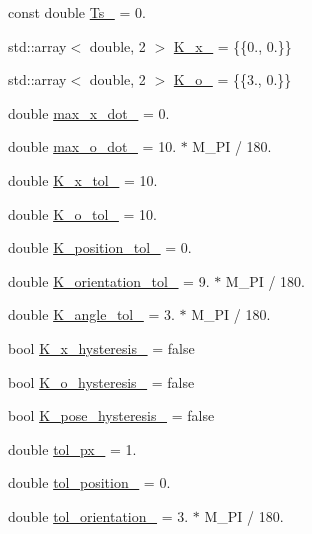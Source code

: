 \begin{DoxyCompactItemize}
const double \hyperlink{classVisualServoingServer_a48bcc91d15c80f7b3b248fa205e8e3de}{Ts\+\_\+} = 0.
\item 
std\+::array$<$ double, 2 $>$ \hyperlink{classVisualServoingServer_a6153b1e315817cf41cb36b7deca83be7}{K\+\_\+x\+\_\+} = \{\{0., 0.\}\}
\item 
std\+::array$<$ double, 2 $>$ \hyperlink{classVisualServoingServer_a5a7eaa18a77566e129a325e556691e24}{K\+\_\+o\+\_\+} = \{\{3., 0.\}\}
\item 
double \hyperlink{classVisualServoingServer_a82df6acf27455af727ce31758856ee48}{max\+\_\+x\+\_\+dot\+\_\+} = 0.
\item 
double \hyperlink{classVisualServoingServer_a2fb091edd86b425b79b36c968a0929e1}{max\+\_\+o\+\_\+dot\+\_\+} = 10. $\ast$ M\+\_\+\+PI / 180.
\item 
double \hyperlink{classVisualServoingServer_aa59bfed390207a42a4a05dd1fe720f6b}{K\+\_\+x\+\_\+tol\+\_\+} = 10.
\item 
double \hyperlink{classVisualServoingServer_ab372aee55fa6ffb7d87d0f9103ea3266}{K\+\_\+o\+\_\+tol\+\_\+} = 10.
\item 
double \hyperlink{classVisualServoingServer_aaef2ff3c3853c7a73bc620225f824e4e}{K\+\_\+position\+\_\+tol\+\_\+} = 0.
\item 
double \hyperlink{classVisualServoingServer_ab1c7e6dbab2608694d520e849da043f8}{K\+\_\+orientation\+\_\+tol\+\_\+} = 9. $\ast$ M\+\_\+\+PI / 180.
\item 
double \hyperlink{classVisualServoingServer_a3eaf0fc5ef519ebb94fc89f3a1e490a2}{K\+\_\+angle\+\_\+tol\+\_\+} = 3. $\ast$ M\+\_\+\+PI / 180.
\item 
bool \hyperlink{classVisualServoingServer_a8b8f0cda1bb882c1783db88b720b5597}{K\+\_\+x\+\_\+hysteresis\+\_\+} = false
\item 
bool \hyperlink{classVisualServoingServer_a19e92e42912ae3f4d784d80465ed55b1}{K\+\_\+o\+\_\+hysteresis\+\_\+} = false
\item 
bool \hyperlink{classVisualServoingServer_a4fdd46d1c8be0e8eb8b28af84cfe8a6b}{K\+\_\+pose\+\_\+hysteresis\+\_\+} = false
\item 
double \hyperlink{classVisualServoingServer_a74ac88af1fee404c750afb59fad98fc6}{tol\+\_\+px\+\_\+} = 1.
\item 
double \hyperlink{classVisualServoingServer_ab2cc91975c9a3f949a99fd6737a2b3bd}{tol\+\_\+position\+\_\+} = 0.
\item 
double \hyperlink{classVisualServoingServer_a2ebbd8cf0f5bf0968bb574fbadb681e8}{tol\+\_\+orientation\+\_\+} = 3. $\ast$ M\+\_\+\+PI / 180.

\end{DoxyCompactItemize}
